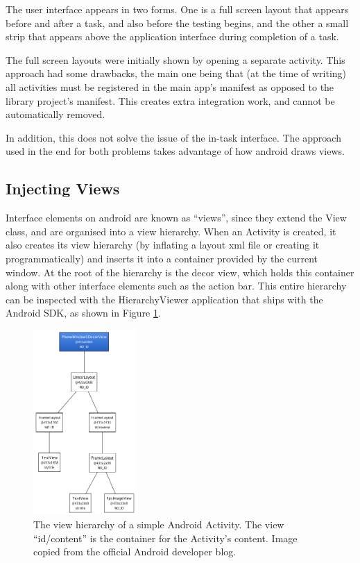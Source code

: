 The user interface appears in two forms. One is a full screen layout
that appears before and after a task, and also before the testing
begins, and the other a small strip that appears above the 
application interface during completion of a task.

The full screen layouts were initially shown by opening a separate
activity. This approach had some drawbacks, the main one being that
(at the time of writing) all activities must be registered in the
main app's manifest as opposed to the library project's manifest.
This creates extra integration work, and cannot be automatically
removed.

In addition, this does not solve the issue of the in-task interface.
The approach used in the end for both problems takes advantage of
how android draws views.

\subsection{Injecting Views}

Interface elements on android are known as ``views'', since they
extend the View class, and are organised into a view hierarchy.
When an Activity is created, it also creates its view hierarchy
(by inflating a layout xml file or creating it programmatically)
and inserts it into a container provided by the current window.
At the root of the hierarchy is the decor view, which holds this
container along with other interface elements such as the action
bar. This entire hierarchy can be inspected with the HierarchyViewer
application that ships with the Android SDK, as shown in Figure
\ref{fig:view-hierarchy}.

\begin{figure}[h]
  \centering
  \includegraphics[width=0.35\textwidth]{images/view-hierarchy}
  \caption{The view hierarchy of a simple Android Activity. The
           view ``id/content'' is the container for the Activity's
           content. Image copied from the official Android 
           developer blog.}
  \label{fig:view-hierarchy}
\end{figure}

